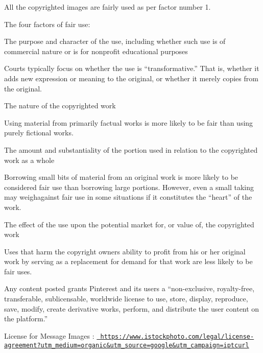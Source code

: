 All the copyrighted images are fairly used as per factor number 1.

The four factors of fair use\+:
\begin{DoxyEnumerate}
\item The purpose and character of the use, including whether such use is of commercial nature or is for nonprofit educational purposes
\end{DoxyEnumerate}

Courts typically focus on whether the use is “transformative.\+” That is, whether it adds new expression or meaning to the original, or whether it merely copies from the original.


\begin{DoxyEnumerate}
\item The nature of the copyrighted work
\end{DoxyEnumerate}

Using material from primarily factual works is more likely to be fair than using purely fictional works.


\begin{DoxyEnumerate}
\item The amount and substantiality of the portion used in relation to the copyrighted work as a whole
\end{DoxyEnumerate}

Borrowing small bits of material from an original work is more likely to be considered fair use than borrowing large portions. However, even a small taking may weighagainst fair use in some situations if it constitutes the “heart” of the work.


\begin{DoxyEnumerate}
\item The effect of the use upon the potential market for, or value of, the copyrighted work
\end{DoxyEnumerate}

Uses that harm the copyright owner\textquotesingle{}s ability to profit from his or her original work by serving as a replacement for demand for that work are less likely to be fair uses.

Any content posted grants Pinterest and its users a “non-\/exclusive, royalty-\/free, transferable, sublicensable, worldwide license to use, store, display, reproduce, save, modify, create derivative works, perform, and distribute the user content on the platform.\+” 


License for Message Images \+: \href{https://www.istockphoto.com/legal/license-agreement?utm_medium=organic&utm_source=google&utm_campaign=iptcurl}{\texttt{ https\+://www.\+istockphoto.\+com/legal/license-\/agreement?utm\+\_\+medium=organic\&utm\+\_\+source=google\&utm\+\_\+campaign=iptcurl}}

